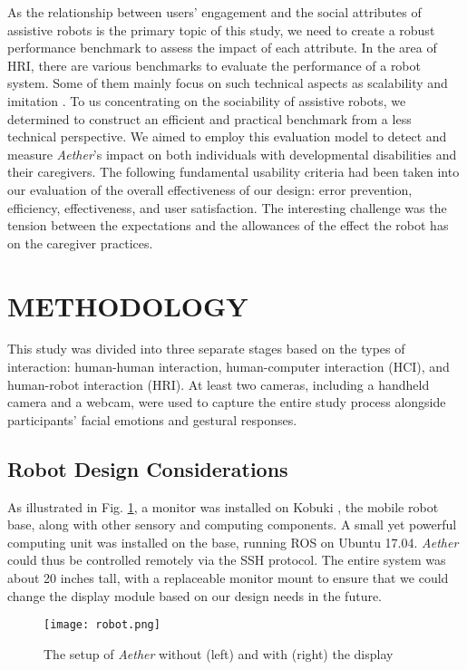 \documentclass[letterpaper, 10 pt, conference]{ieeeconf}  %
\begin{document}
As the relationship between users' engagement and the social attributes of assistive robots is the primary topic of this study, we need to create a robust performance benchmark to assess the impact of each attribute. In the area of HRI, there are various benchmarks to evaluate the performance of a robot system. Some of them mainly focus on such technical aspects as scalability and imitation \cite{Feil-Seifer2007}. To us concentrating on the sociability of assistive robots, we determined to construct an efficient and practical benchmark from a less technical perspective. We aimed to employ this evaluation model to detect and measure \textit{Aether}'s impact on both individuals with developmental disabilities and their caregivers. The following fundamental usability criteria had been taken into our evaluation of the overall effectiveness of our design: error prevention, efficiency, effectiveness, and user satisfaction. The interesting challenge was the tension between the expectations and the allowances of the effect the robot has on the caregiver practices.


\section{METHODOLOGY}

 This study was divided into three separate stages based on the types of interaction: human-human interaction, human-computer interaction (HCI), and human-robot interaction (HRI). At least two cameras, including a handheld camera and a webcam, were used to capture the entire study process alongside participants' facial emotions and gestural responses.

\subsection{Robot Design Considerations}

As illustrated in Fig. \ref{fig:robotsetup}, a monitor was installed on Kobuki \cite{Kobuki2015}, the mobile robot base, along with other sensory and computing components. A small yet powerful computing unit was installed on the base, running ROS on Ubuntu 17.04. \textit{Aether} could thus be controlled remotely via the SSH protocol. The entire system was about 20 inches tall, with a replaceable monitor mount to ensure that we could change the display module based on our design needs in the future.

\begin{figure}[hbt]
\centering
\texttt{[image: robot.png]}
\caption{The setup of \textit{Aether} without (left) and with (right) the display}
\label{fig:robotsetup}
\end{figure}
\end{document}

